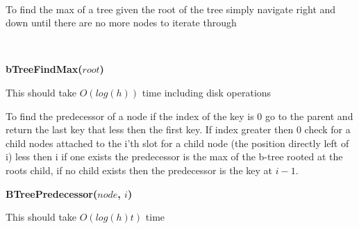 \documentclass[11pt]{article}
\begin{document}
	\newpage
	\\
	
	 To find the max of a tree given the root of the tree simply navigate right and down until there are no more nodes to iterate through
	
	\\
	\begin{algorithm}[H]
		\NoCaptionOfAlgo
		\caption{\bf bTreeFindMax($root$)}
		
	\end{algorithm}
	
	 This should take $O(log(h))$ time including disk operations
	\bigskip
	

	 To find the predecessor of a node if the index of the key is 0 go to the parent and return the last key that less then the first key. If index greater then 0 check for a child nodes attached to the i'th slot for a child node (the position directly left of i)  less then i if one exists the predecessor is the max of the b-tree rooted at the roots child, if no child exists then the predecessor is the key at $i-1$.
	\newpage
	\\
	\begin{algorithm}[H]
		\NoCaptionOfAlgo
		\caption{\bf BTreePredecessor($node$, $i$)}
	\end{algorithm}
	 This should take $O(log(h)t)$ time
	\bigskip
	
\end{document}
